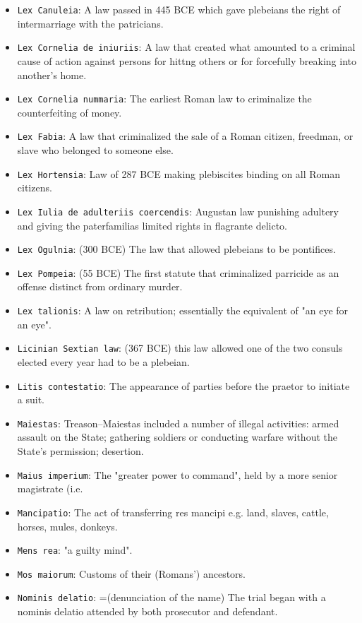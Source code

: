 \documentclass[11pt]{article}
\begin{document}
\begin{itemize}
\item \texttt{Lex Canuleia}: A law passed in 445 BCE which gave plebeians the right of intermarriage with the patricians.
\item \texttt{Lex Cornelia de iniuriis}: A law that created what amounted to a criminal cause of action against persons for hittng others or for forcefully breaking into another's home.
\item \texttt{Lex Cornelia nummaria}: The earliest Roman law to criminalize the counterfeiting of money.
\item \texttt{Lex Fabia}: A law that criminalized the sale of a Roman citizen, freedman, or slave who belonged to someone else.
\item \texttt{Lex Hortensia}: Law of 287 BCE making plebiscites binding on all Roman citizens.
\item \texttt{Lex Iulia de adulteriis coercendis}: Augustan law punishing adultery and giving the paterfamilias limited rights in flagrante delicto.
\item \texttt{Lex Ogulnia}: (300 BCE) The law that allowed plebeians to be pontifices.
\item \texttt{Lex Pompeia}: (55 BCE) The first statute that criminalized parricide as an offense distinct from ordinary murder.
\item \texttt{Lex talionis}: A law on retribution; essentially the equivalent of "an eye for an eye".
\item \texttt{Licinian Sextian law}: (367 BCE) this law allowed one of the two consuls elected every year had to be a plebeian.
\item \texttt{Litis contestatio}: The appearance of parties before the praetor to initiate a suit.
\item \texttt{Maiestas}: Treason--Maiestas included a number of illegal activities: armed assault on the State; gathering soldiers or conducting warfare without the State's permission; desertion.
\item \texttt{Maius imperium}: The "greater power to command", held by a more senior magistrate (i.e.
\item \texttt{Mancipatio}: The act of transferring res mancipi e.g. land, slaves, cattle, horses, mules, donkeys.
\item \texttt{Mens rea}: "a guilty mind".
\item \texttt{Mos maiorum}: Customs of their (Romans') ancestors.
\item \texttt{Nominis delatio}: =(denunciation of the name) The trial began with a nominis delatio attended by both prosecutor and defendant.

\end{itemize}
\end{document}
